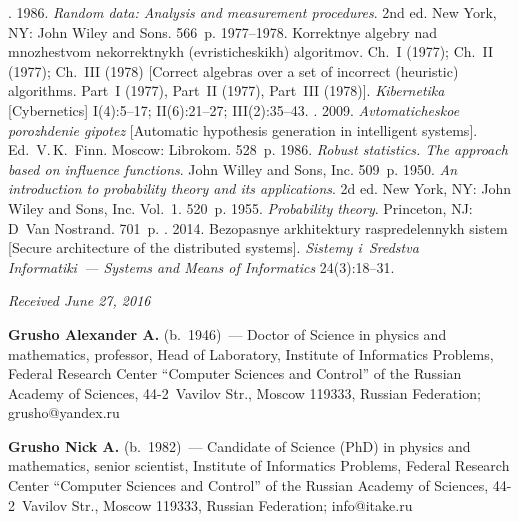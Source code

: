 \begin{multicols}{2}
{{\begin{thebibliography}{99}
. 1986. \textit{Random data: Analysis and 
measurement procedures}. 2nd ed. New York, NY: John Wiley and Sons. 566~p.
 1977--1978. Korrektnye algebry nad mnozhestvom 
nekorrektnykh (evristicheskikh) algoritmov. Ch.~I (1977); Ch.~II (1977); 
Ch.~III (1978) [Correct algebras over a set of incorrect (heuristic) algorithms. 
Part~I (1977), Part~II (1977), Part~III (1978)]. \textit{Kibernetika} [Cybernetics] 
I(4):5--17; II(6):21--27; III(2):35--43. 
. 2009.
\textit{Avtomaticheskoe porozhdenie gipotez} [Automatic hypothesis generation in 
intelligent systems]. Ed.\ V.\,K.~Finn. Moscow:  Librokom. 528~p. 
 1986. 
\textit{Robust statistics. The approach based on influence functions}. John Willey 
and Sons, Inc. 509~p.
 1950. \textit{An introduction to probability theory and its 
applications}. 2d ed. New York, NY: John Wiley and Sons, Inc. Vol.~1. 520~p.
 1955. \textit{Probability theory}. Princeton, NJ: 
D~Van Nostrand. 701~p. 
. 2014. Bezopasnye 
arkhitektury raspredelennykh sistem [Secure architecture of the distributed systems]. 
\textit{Sistemy i~Sredstva Informatiki~--- Systems and Means of Informatics} 
24(3):18--31.
   \end{thebibliography}

 }
 }

\end{multicols}

\vspace*{-3pt}

\hfill{\small\textit{Received June 27, 2016}}

\vspace*{-12pt}

\Contr

\noindent
\textbf{Grusho Alexander A.} (b.\ 1946)~---  Doctor of Science in physics and mathematics, 
professor, Head of Laboratory, Institute of Informatics Problems, Federal Research Center 
``Computer Sciences and Control'' of the Russian Academy of Sciences, 44-2~Vavilov Str., Moscow 
119333, Russian Federation; \mbox{grusho@yandex.ru} 

\pagebreak

\noindent
\textbf{Grusho Nick A.} (b.\ 1982)~---  Candidate of Science (PhD) in physics and mathematics, 
senior scientist, Institute of Informatics Problems, Federal Research Center ``Computer Sciences 
and Control'' of the Russian Academy of Sciences, 44-2~Vavilov Str., Moscow 119333, Russian 
Federation; \mbox{info@itake.ru}

